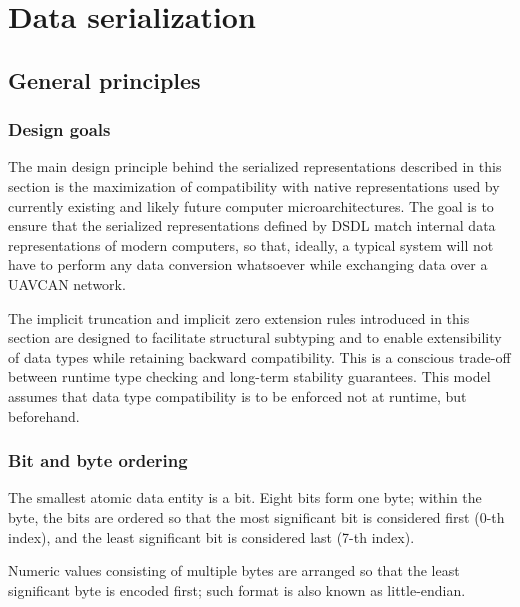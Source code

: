 \section{Data serialization}\label{sec:dsdl_data_serialization}

\newcommand{\hugett}[1]{\texttt{\huge{#1}}}

\subsection{General principles}

\subsubsection{Design goals}

The main design principle behind the serialized representations described in this section is
the maximization of compatibility with native representations used by currently existing and
likely future computer microarchitectures.
The goal is to ensure that the serialized representations defined by DSDL match internal data representations of
modern computers, so that, ideally, a typical system will not have to perform any data conversion whatsoever while
exchanging data over a UAVCAN network.

The implicit truncation and implicit zero extension rules introduced in this section are designed to
facilitate structural subtyping and to enable extensibility of data types while retaining backward compatibility.
This is a conscious trade-off between runtime type checking and long-term stability guarantees.
This model assumes that data type compatibility is to be enforced not at runtime, but beforehand.

\subsubsection{Bit and byte ordering}

The smallest atomic data entity is a bit.
Eight bits form one byte;
within the byte, the bits are ordered so that the most significant bit is considered first (0-th index),
and the least significant bit is considered last (7-th index).

Numeric values consisting of multiple bytes are arranged so that the least significant byte is encoded first;
such format is also known as little-endian.

